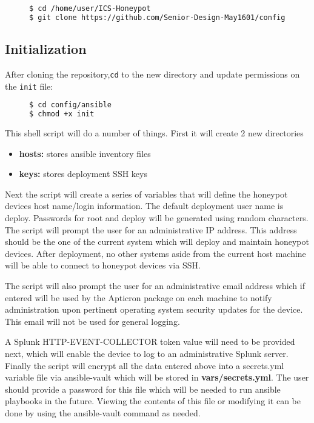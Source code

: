 \begin{figure}[H]
\small
\begin{lstlisting}[language=Bash,frame=single]
$ cd /home/user/ICS-Honeypot
$ git clone https://github.com/Senior-Design-May1601/config
\end{lstlisting}
\end{figure}

\subsection{Initialization}
After cloning the repository,\texttt{cd} to the
new directory and update permissions on the \texttt{init} file:

\begin{figure}[H]
\small
\begin{lstlisting}[language=Bash,frame=single]
$ cd config/ansible
$ chmod +x init
\end{lstlisting}
\end{figure}

This shell script will do a number of things. First it will create 2 new directories
\begin{itemize}
\item \textbf{hosts:} stores ansible inventory files
\item \textbf{keys:} stores deployment SSH keys
\end{itemize}
Next the script will create a series of variables that will define the honeypot devices host name/login information. The default deployment user name is deploy. Passwords for root and deploy will be generated using random characters. The script will prompt the user for an administrative IP address. This address should be the one of the current system which will deploy and maintain honeypot devices. After deployment, no other systems aside from the current host machine will be able to connect to honeypot devices via SSH.

The script will also prompt the user for an administrative email address which if entered will be used by the Apticron package on each machine to notify administration upon pertinent operating system security updates for the device. This email will not be used for general logging.

A Splunk HTTP-EVENT-COLLECTOR token value will need to be provided next, which will enable the device to log to an administrative Splunk server. Finally the script will encrypt all the data entered above into a secrets.yml variable file via ansible-vault which will be stored in \textbf{vars/secrets.yml}. The user should provide a password for this file which will be needed to run ansible playbooks in the future. Viewing the contents of this file or modifying it can be done by using the ansible-vault command as needed.

